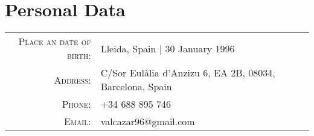 \section{Personal Data}
\begin{center}
\begin{tabular}{ r l }
	\textsc{Place an date of birth:} 	& Lleida, Spain | 30 January 1996 \\
	\textsc{Address:}			& C/Sor Eulàlia d'Anzizu 6, EA 2B, 08034, Barcelona, Spain \\
	\textsc{Phone:}				& +34 688 895 746 \\
	\textsc{Email:}				& valcazar96@gmail.com \\
\end{tabular}
\end{center}
